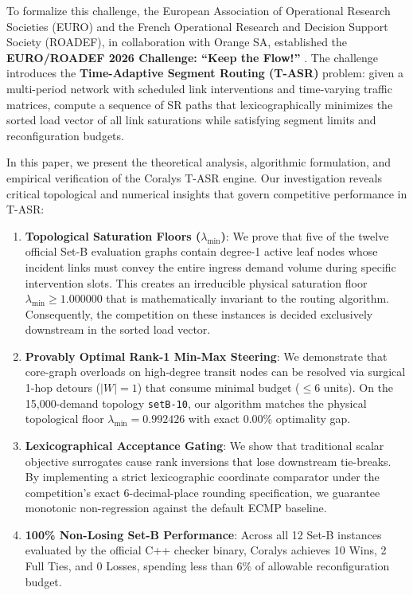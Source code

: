 \documentclass[10pt,journal,compsoc]{IEEEtran}
\begin{document}
To formalize this challenge, the European Association of Operational Research Societies (EURO) and the French Operational Research and Decision Support Society (ROADEF), in collaboration with Orange SA, established the \textbf{EURO/ROADEF 2026 Challenge: ``Keep the Flow!''} \cite{roadef2026rules}. The challenge introduces the \textbf{Time-Adaptive Segment Routing (T-ASR)} problem: given a multi-period network with scheduled link interventions and time-varying traffic matrices, compute a sequence of SR paths that lexicographically minimizes the sorted load vector of all link saturations while satisfying segment limits and reconfiguration budgets.

In this paper, we present the theoretical analysis, algorithmic formulation, and empirical verification of the Coralys T-ASR engine. Our investigation reveals critical topological and numerical insights that govern competitive performance in T-ASR:
\begin{enumerate}
    \item \textbf{Topological Saturation Floors ($\lambda_{\min}$)}: We prove that five of the twelve official Set-B evaluation graphs contain degree-1 active leaf nodes whose incident links must convey the entire ingress demand volume during specific intervention slots. This creates an irreducible physical saturation floor $\lambda_{\min} \ge 1.000000$ that is mathematically invariant to the routing algorithm. Consequently, the competition on these instances is decided exclusively downstream in the sorted load vector.
    \item \textbf{Provably Optimal Rank-1 Min-Max Steering}: We demonstrate that core-graph overloads on high-degree transit nodes can be resolved via surgical 1-hop detours ($|W| = 1$) that consume minimal budget ($\le 6$ units). On the 15,000-demand topology \texttt{setB-10}, our algorithm matches the physical topological floor $\lambda_{\min} = 0.992426$ with exact 0.00\% optimality gap.
    \item \textbf{Lexicographical Acceptance Gating}: We show that traditional scalar objective surrogates cause rank inversions that lose downstream tie-breaks. By implementing a strict lexicographic coordinate comparator under the competition's exact 6-decimal-place rounding specification, we guarantee monotonic non-regression against the default ECMP baseline.
    \item \textbf{100\% Non-Losing Set-B Performance}: Across all 12 Set-B instances evaluated by the official C++ checker binary, Coralys achieves 10 Wins, 2 Full Ties, and 0 Losses, spending less than 6\% of allowable reconfiguration budget.
\end{enumerate}
\end{document}

